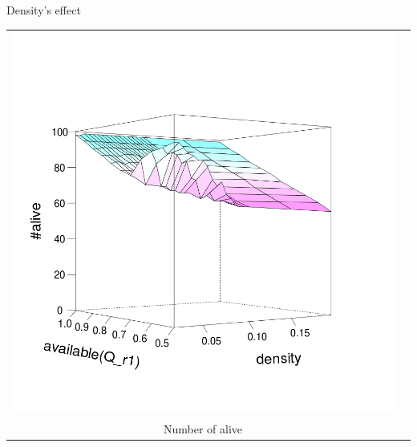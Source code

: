 \documentclass[8pt, handout=show,notes=show]{beamer}
\begin{document}
\begin{frame}{Density's effect}
\begin{table}[H]
\begin{tabular}{cc}
			\includegraphics[width=\imgSize]{images/active_median}\\
			Number of alive&\\
		\end{tabular}

	\end{table}

\end{frame}
\end{document}
